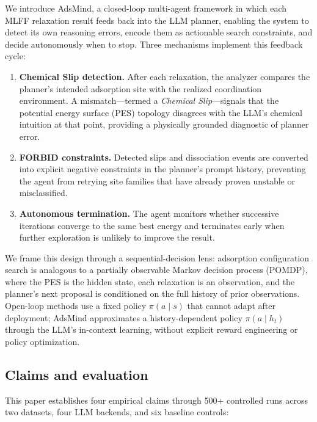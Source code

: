 We introduce AdsMind, a closed-loop multi-agent framework in which each MLFF relaxation result feeds back into the LLM planner, enabling the system to detect its own reasoning errors, encode them as actionable search constraints, and decide autonomously when to stop.
Three mechanisms implement this feedback cycle:

\begin{enumerate}
    \item \textbf{Chemical Slip detection.} After each relaxation, the analyzer compares the planner's intended adsorption site with the realized coordination environment. A mismatch---termed a \textit{Chemical Slip}---signals that the potential energy surface (PES) topology disagrees with the LLM's chemical intuition at that point, providing a physically grounded diagnostic of planner error.
    \item \textbf{FORBID constraints.} Detected slips and dissociation events are converted into explicit negative constraints in the planner's prompt history, preventing the agent from retrying site families that have already proven unstable or misclassified.
    \item \textbf{Autonomous termination.} The agent monitors whether successive iterations converge to the same best energy and terminates early when further exploration is unlikely to improve the result.
\end{enumerate}

We frame this design through a sequential-decision lens: adsorption configuration search is analogous to a partially observable Markov decision process (POMDP), where the PES is the hidden state, each relaxation is an observation, and the planner's next proposal is conditioned on the full history of prior observations.
Open-loop methods use a fixed policy $\pi(a \mid s)$ that cannot adapt after deployment; AdsMind approximates a history-dependent policy $\pi(a \mid h_t)$ through the LLM's in-context learning, without explicit reward engineering or policy optimization.

\subsection{Claims and evaluation}

This paper establishes four empirical claims through 500+ controlled runs across two datasets, four LLM backends, and six baseline controls:

